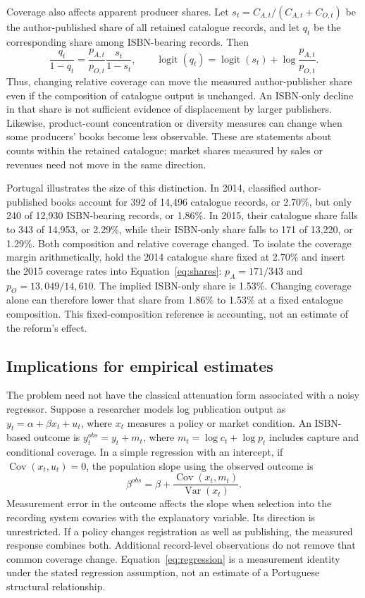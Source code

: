 \documentclass[11pt]{article}
\begin{document}
Coverage also affects apparent producer shares. Let $s_t=C_{A,t}/(C_{A,t}+C_{O,t})$ be the author-published share of all retained catalogue records, and let $q_t$ be the corresponding share among ISBN-bearing records. Then
\begin{equation}\label{eq:shares}
\frac{q_t}{1-q_t}=\frac{p_{A,t}}{p_{O,t}}\frac{s_t}{1-s_t},
\qquad
\operatorname{logit}(q_t)=\operatorname{logit}(s_t)+\log\frac{p_{A,t}}{p_{O,t}}.
\end{equation}
Thus, changing relative coverage can move the measured author-publisher share even if the composition of catalogue output is unchanged. An ISBN-only decline in that share is not sufficient evidence of displacement by larger publishers. Likewise, product-count concentration or diversity measures can change when some producers' books become less observable. These are statements about counts within the retained catalogue; market shares measured by sales or revenues need not move in the same direction.

Portugal illustrates the size of this distinction. In 2014, classified author-published books account for 392 of 14,496 catalogue records, or 2.70\%, but only 240 of 12,930 ISBN-bearing records, or 1.86\%. In 2015, their catalogue share falls to 343 of 14,953, or 2.29\%, while their ISBN-only share falls to 171 of 13,220, or 1.29\%. Both composition and relative coverage changed. To isolate the coverage margin arithmetically, hold the 2014 catalogue share fixed at 2.70\% and insert the 2015 coverage rates into Equation~\ref{eq:shares}: $p_A=171/343$ and $p_O=13{,}049/14{,}610$. The implied ISBN-only share is 1.53\%. Changing coverage alone can therefore lower that share from 1.86\% to 1.53\% at a fixed catalogue composition. This fixed-composition reference is accounting, not an estimate of the reform's effect.

\subsection{Implications for empirical estimates}

The problem need not have the classical attenuation form associated with a noisy regressor. Suppose a researcher models log publication output as $y_t=\alpha+\beta x_t+u_t$, where $x_t$ measures a policy or market condition. An ISBN-based outcome is $y_t^{obs}=y_t+m_t$, where $m_t=\log c_t+\log p_t$ includes capture and conditional coverage. In a simple regression with an intercept, if $\operatorname{Cov}(x_t,u_t)=0$, the population slope using the observed outcome is
\begin{equation}\label{eq:regression}
\beta^{obs}=\beta+\frac{\operatorname{Cov}(x_t,m_t)}{\operatorname{Var}(x_t)}.
\end{equation}
Measurement error in the outcome affects the slope when selection into the recording system covaries with the explanatory variable. Its direction is unrestricted. If a policy changes registration as well as publishing, the measured response combines both. Additional record-level observations do not remove that common coverage change. Equation~\ref{eq:regression} is a measurement identity under the stated regression assumption, not an estimate of a Portuguese structural relationship.
\end{document}
